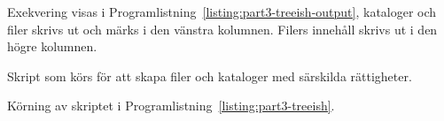 Exekvering visas i Programlistning~\ref{listing:part3-treeish-output}, kataloger
och filer skrivs ut och märks i den vänstra kolumnen. Filers innehåll skrivs ut
i den högre kolumnen.

\begin{listing}[H]
\caption{Skript som körs för att skapa filer och kataloger med särskilda rättigheter.}
\label{listing:part3-treeish}
\end{listing}

\begin{listing}[H]
\caption{Körning av skriptet i Programlistning~\ref{listing:part3-treeish}.}
\label{listing:part3-treeish-output}
\end{listing}
